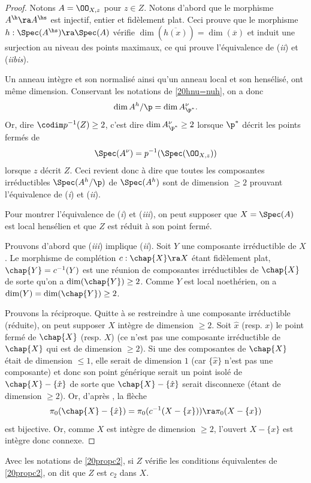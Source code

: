 \documentclass[10pt]{../fichiers-configuration-latex/smfart}
\begin{document}
\begin{proof}Notons $A=\OO_{X,z}$ pour $z\in Z$. Notons d'abord que le morphisme $A^\h\ra A^\hs$ est
injectif, entier et fidèlement plat. Ceci prouve que le morphisme $h:\Spec(A^\hs)\ra\Spec(A)$
vérifie $\dim(\overline{h(x)})=\dim(\overline{x})$ et induit une surjection au niveau des points
maximaux, ce qui prouve l'équivalence de (\textit{ii}) et (\textit{iibis}).

Un anneau intègre et son normalisé ainsi qu'un anneau local et son hensélisé, ont même dimension.
Conservant les notations de \ref{20hnu=nuh}, on a donc $$\dim A^h/\p=\dim A^\nu_{\p^*}.$$  Or, dire
$\codim p^{-1}(Z)\geq 2$, c'est dire $\dim A^\nu_{\p^*}\geq 2$ lorsque $\p^*$ décrit les points
fermés de  $$\Spec(A^\nu)=p^{-1}(\Spec(\OO_{X,z}))$$ lorsque $z$ décrit $Z$. Ceci revient donc à dire
que toutes les composantes irréductibles $\Spec(A^h/\p)$ de $\Spec(A^h)$ sont de dimension $\geq 2$
prouvant l'équivalence de (\textit{i}) et (\textit{ii}).

Pour montrer l'équivalence de (\textit{i}) et (\textit{iii}), on peut supposer que $X=\Spec(A)$ est
local hensélien et que $Z$ est réduit à son point fermé.

Prouvons d'abord que (\textit{iii}) implique (\textit{ii}). Soit $Y$ une composante irréductible de
$X$. Le morphisme de complétion $c:\chap{X}\ra X$ étant  fidèlement plat, $\chap{Y}=c^{-1}(Y)$ est
une réunion de composantes irréductibles de $\chap{X}$ de sorte qu'on a $\dim(\chap{Y})\geq 2$.
Comme $Y$ est local noethérien, on a $\dim(Y)=\dim(\chap{Y})\geq 2$.

Prouvons la réciproque. Quitte à se restreindre à une composante irréductible (réduite), on peut
supposer $X$ intègre de dimension $\geq 2$. Soit $\hat x$ (resp. $x$) le point fermé de $\chap{X}$
(resp. $X$) (ce n'est pas une composante irréductible de $\chap{X}$ qui est de dimension $\geq 2$).
Si une des composantes de $\chap{X}$ était de dimension $\leq 1$, elle serait de dimension $1$ (car
$\{\hat x\}$ n'est pas une composante) et donc son point générique serait un point isolé de
$\chap{X}-\{\hat x\}$ de sorte que $\chap{X}-\{\hat x\}$ serait disconnexe (étant de dimension $\geq
2$). Or, d'après \cite[corollaire 4.4]{Fer-Ray70}, la flèche $$\pi_0(\chap{X}-\{\hat
x\})=\pi_0(c^{-1}(X-\{x\}))\ra\pi_0(X-\{x\})$$ est bijective. Or, comme $X$ est intègre de dimension
$\geq 2$, l'ouvert  $X-\{x\}$ est intègre donc connexe. \end{proof}

\begin{definition}\label{20defc2} Avec les notations de \ref{20propc2}, si $Z$ vérifie les
conditions équivalentes de  \ref{20propc2}, on dit que $Z$ est $c_2$ dans $X$.  \end{definition}
\end{document}
